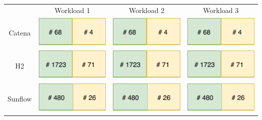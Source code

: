 \begin{table}[h]
	\centering %
    \begin{tabular}{c c c c}

         		& Workload 1 & Workload 2 & Workload 3 \\

        Catena 	& \includegraphics[width=.15\linewidth]{images/resCatenaWL1} & \includegraphics[width=.15\linewidth]{images/resCatenaWL1} & \includegraphics[width=.15\linewidth]{images/resCatenaWL1} \\

        H2 		& \includegraphics[width=.15\linewidth]{images/resH2} & \includegraphics[width=.15\linewidth]{images/resH2} & \includegraphics[width=.15\linewidth]{images/resH2} \\

        Sunflow & \includegraphics[width=.15\linewidth]{images/resSunflow} & \includegraphics[width=.15\linewidth]{images/resSunflow} & \includegraphics[width=.15\linewidth]{images/resSunflow} \\

    \end{tabular}
    \label{table:res:learning}
\end{table}

